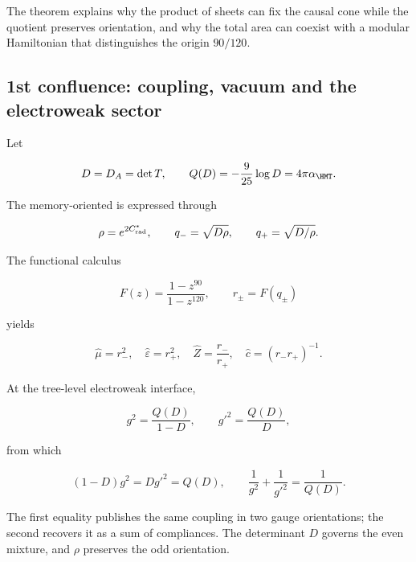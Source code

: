 The theorem explains why the product of sheets can fix the causal cone while the quotient preserves orientation, and why the total area can coexist with a modular Hamiltonian that distinguishes the origin \(90/120\).

\subsection{1st confluence: coupling, vacuum and the electroweak sector}

Let

\begin{equation}
 D=D_A=\det T,
 \qquad
 Q(D)=-\frac9{25}\log D=4\pi\alpha_{\HMT}.
 \label{rm:eq:confluence-q-d}
\end{equation}

The memory-oriented is expressed through

\begin{equation}
 \rho=e^{2C^*_{\rm rad}},
 \qquad
 q_-=\sqrt{D\rho},
 \qquad
 q_+=\sqrt{D/\rho}.
 \label{rm:eq:confluence-qpm}
\end{equation}

The functional calculus

\begin{equation}
 F(z)=\frac{1-z^{90}}{1-z^{120}},
 \qquad
 r_\pm=F(q_\pm)
 \label{rm:eq:confluence-F}
\end{equation}

yields

\begin{equation}
 \widehat\mu=r_-^2,
 \quad
 \widehat\varepsilon=r_+^2,
 \quad
 \widehat Z=\frac{r_-}{r_+},
 \quad
 \widehat c=(r_-r_+)^{-1}.
 \label{rm:eq:confluence-vacuum}
\end{equation}

At the tree-level electroweak interface,

\begin{equation}
 g^2=\frac{Q(D)}{1-D},
 \qquad
 g'^2=\frac{Q(D)}{D},
 \label{rm:eq:confluence-gauge-couplings}
\end{equation}

from which

\begin{equation}
 \boxed{
 (1-D)g^2=Dg'^2=Q(D),
 \qquad
 \frac1{g^2}+\frac1{g'^2}=\frac1{Q(D)}.}
 \label{rm:eq:confluence-ew-master}
\end{equation}

The first equality publishes the same coupling in two gauge
orientations; the second recovers it as a sum of compliances. The determinant
\(D\) governs the even mixture, and \(\rho\) preserves the odd orientation.

